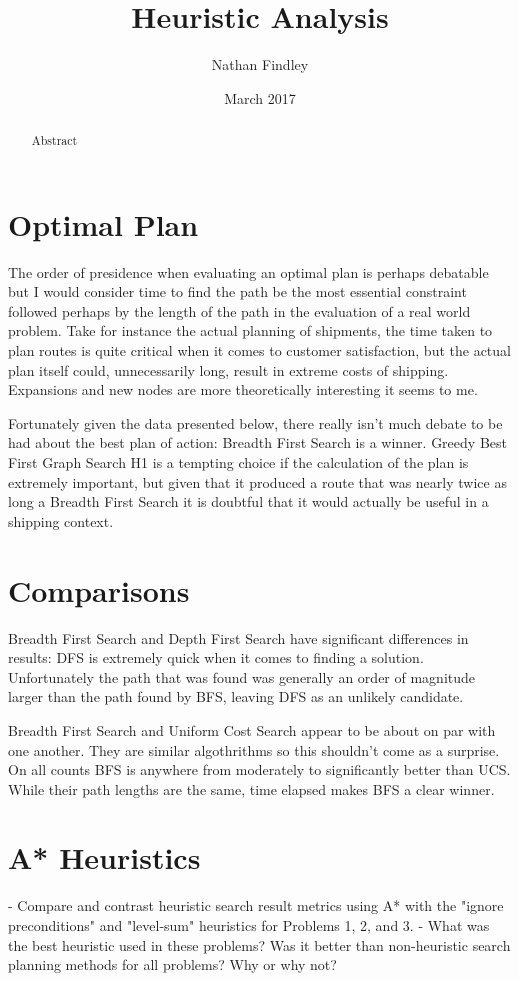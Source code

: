 \documentclass[10pt, a4paper]{article}
\title{Heuristic Analysis}
\author{Nathan Findley}
\date{March 2017}
\begin{document}
\maketitle
\tableofcontents

\begin{abstract}
	Abstract
\end{abstract}

\section{Optimal Plan}

The order of presidence when evaluating an optimal plan is perhaps debatable
but I would consider time to find the path be the most essential constraint followed
perhaps by the length of the path in the evaluation of a real world problem.  Take for
instance the actual planning of shipments, the time taken to plan routes is quite critical
when it comes to customer satisfaction, but the actual plan itself could, unnecessarily long,
result in extreme costs of shipping.  Expansions and new nodes are more theoretically interesting
it seems to me.

Fortunately given the data presented below, there really isn't much debate to be had about the
best plan of action: Breadth First Search is a winner.  Greedy Best First Graph Search H1 is a
tempting choice if the calculation of the plan is extremely important, but given that it produced
a route that was nearly twice as long a Breadth First Search it is doubtful that it would actually
be useful in a shipping context.

\section{Comparisons}

Breadth First Search and Depth First Search have significant differences in results: DFS is extremely quick when it comes to finding a solution.  Unfortunately
the path that was found was generally an order of magnitude larger than the path found by BFS, leaving DFS as an unlikely candidate.

Breadth First Search and Uniform Cost Search appear to be about on par with one another.  They are similar algothrithms so this shouldn't come as a surprise.
On all counts BFS is anywhere from moderately to significantly better than UCS.  While their path lengths are the same, time elapsed makes BFS a clear winner.

\section{A* Heuristics}
- Compare and contrast heuristic search result metrics using A* with the "ignore preconditions" and "level-sum" heuristics for Problems 1, 2, and 3.
- What was the best heuristic used in these problems?  Was it better than non-heuristic search planning methods for all problems?  Why or why not?
\end{document}
